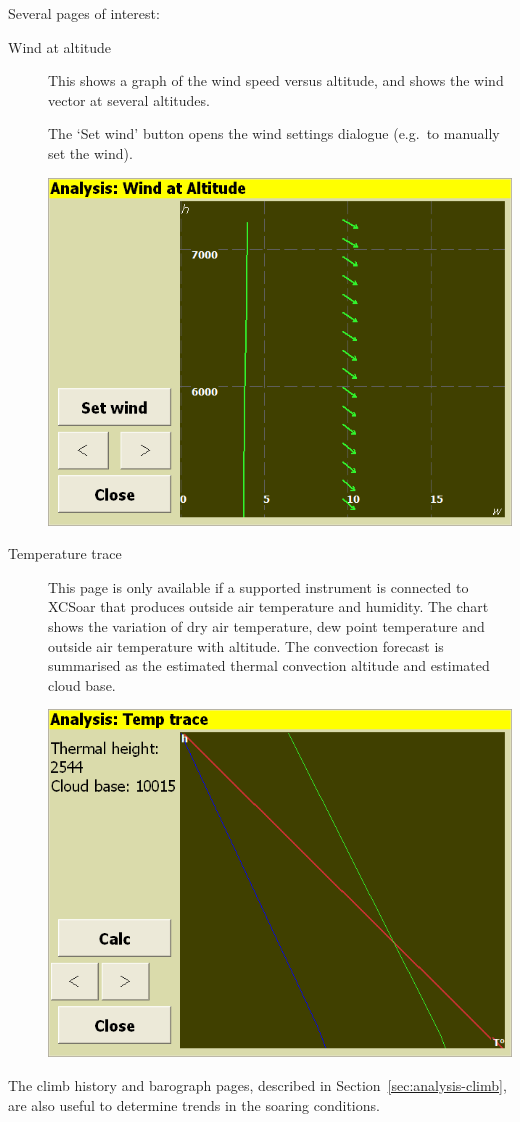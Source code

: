 Several pages of interest:
\begin{description}

\item[Wind at altitude]
  This shows a graph of the wind speed versus altitude, and shows the
  wind vector at several altitudes.

The `Set wind' button opens the wind settings dialogue (e.g.\ to
manually set the wind).

\begin{center}
\includegraphics[angle=0,width=0.8\linewidth,keepaspectratio='true']{figures/analysis-wind.png}
\end{center}

\item[Temperature trace]
  This page is only available if a supported instrument is connected
  to XCSoar that produces outside air temperature and humidity.  The
  chart shows the variation of dry air temperature, dew point
  temperature and outside air temperature with altitude.  The convection
  forecast is summarised as the estimated thermal convection altitude
  and estimated cloud base.

\begin{center}
\includegraphics[angle=0,width=0.8\linewidth,keepaspectratio='true']{figures/analysis-temptrace.png}
\end{center}

\end{description}
The climb history and barograph pages, described in
Section~\ref{sec:analysis-climb}, are also useful to determine
trends in the soaring conditions.

